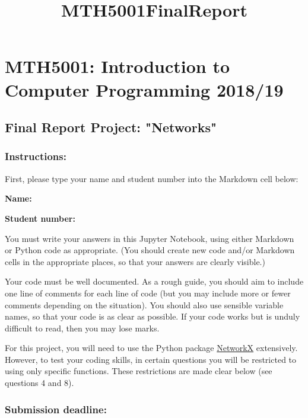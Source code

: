 \documentclass[11pt]{article}
\title{MTH5001FinalReport}
\begin{document}
    
    
    \maketitle
    
    

    
    \section{MTH5001: Introduction to Computer Programming
2018/19}\label{mth5001-introduction-to-computer-programming-201819}

\subsection{Final Report Project:
"Networks"}\label{final-report-project-networks}

    \subsubsection{Instructions:}\label{instructions}

First, please type your name and student number into the Markdown cell
below:

    \textbf{Name:}

\textbf{Student number:}

    You must write your answers in this Jupyter Notebook, using either
Markdown or Python code as appropriate. (You should create new code
and/or Markdown cells in the appropriate places, so that your answers
are clearly visible.)

Your code must be well documented. As a rough guide, you should aim to
include one line of comments for each line of code (but you may include
more or fewer comments depending on the situation). You should also use
sensible variable names, so that your code is as clear as possible. If
your code works but is unduly difficult to read, then you may lose
marks.

For this project, you will need to use the Python package
\href{https://networkx.github.io/}{NetworkX} extensively. However, to
test your coding skills, in certain questions you will be restricted to
using only specific functions. These restrictions are made clear below
(see questions 4 and 8).

\subsubsection{Submission deadline:}\label{submission-deadline}
\end{document}
